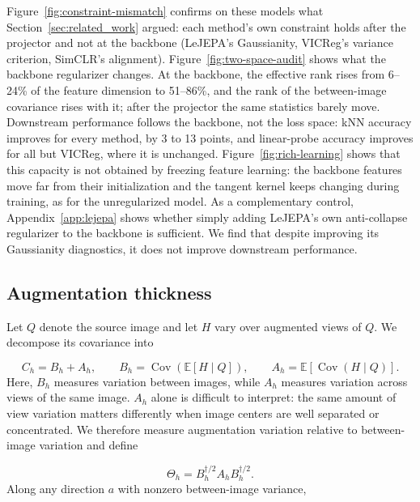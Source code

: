 \documentclass{article} %
\theoremstyle{remark}
\begin{document}
Figure~\ref{fig:constraint-mismatch} confirms on these models what Section~\ref{sec:related_work} argued: each method's own constraint holds after the projector and not at the backbone (LeJEPA's Gaussianity, VICReg's variance criterion, SimCLR's alignment). Figure~\ref{fig:two-space-audit} shows what the backbone regularizer changes. At the backbone, the effective rank rises from 6--24\% of the feature dimension to 51--86\%, and the rank of the between-image covariance rises with it; after the projector the same statistics barely move. Downstream performance follows the backbone, not the loss space: kNN accuracy improves for every method, by 3 to 13 points, and linear-probe accuracy improves for all but VICReg, where it is unchanged. Figure~\ref{fig:rich-learning} shows that this capacity is not obtained by freezing feature learning: the backbone features move far from their initialization and the tangent kernel keeps changing during training, as for the unregularized model. As a complementary control, Appendix~\ref{app:lejepa} shows whether simply adding LeJEPA's own anti-collapse regularizer to the backbone is sufficient. We find that despite improving its Gaussianity diagnostics, it does not improve downstream performance.


\subsection{Augmentation thickness}

\label{sec:exp-thickness}
Let $Q$ denote the source image and let $H$ vary over augmented views of $Q$. We decompose its covariance into

\begin{equation}
    C_h = B_h + A_h,
    \qquad
    B_h = \operatorname{Cov}\!\left(\mathbb{E}[H \mid Q]\right),
    \qquad
    A_h = \mathbb{E}\!\left[\operatorname{Cov}(H \mid Q)\right].
\end{equation}
Here, $B_h$ measures variation between images, while $A_h$ measures variation across views of the same image. $A_h$ alone is difficult to interpret: the same amount of view variation matters differently when image centers are well separated or concentrated. We therefore measure augmentation variation relative to between-image variation and define

\begin{equation}
    \Theta_h
    =
    B_h^{\dagger/2} A_h B_h^{\dagger/2}.
    \label{eq:thickness}
\end{equation}
Along any direction $a$ with nonzero between-image variance,
\end{document}
